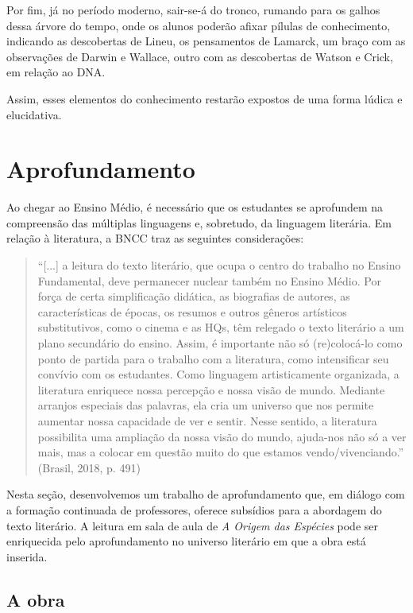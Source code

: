 \documentclass[12pt]{extarticle}
\begin{document}
Por fim, já no período moderno, sair-se-á do tronco, rumando para os
galhos dessa árvore do tempo, onde os alunos poderão afixar pílulas de
conhecimento, indicando as descobertas de Lineu, os pensamentos de
Lamarck, um braço com as observações de Darwin e Wallace, outro com as
descobertas de Watson e Crick, em relação ao DNA.

Assim, esses elementos do conhecimento restarão expostos de uma forma
lúdica e elucidativa.

\section{Aprofundamento}

Ao chegar ao Ensino Médio, é necessário que os estudantes se aprofundem
na compreensão das múltiplas linguagens e, sobretudo, da linguagem
literária. Em relação à literatura, a BNCC traz as seguintes
considerações:

\begin{quotation}
``{[}...{]} a leitura do texto literário, que ocupa o centro do trabalho
no Ensino Fundamental, deve permanecer nuclear também no Ensino Médio.
Por força de certa simplificação didática, as biografias de autores, as
características de épocas, os resumos e outros gêneros artísticos
substitutivos, como o cinema e as HQs, têm relegado o texto literário a
um plano secundário do ensino. Assim, é importante não só (re)colocá-lo
como ponto de partida para o trabalho com a literatura, como
intensificar seu convívio com os estudantes. Como linguagem
artisticamente organizada, a literatura enriquece nossa percepção e
nossa visão de mundo. Mediante arranjos especiais das palavras, ela cria
um universo que nos permite aumentar nossa capacidade de ver e sentir.
Nesse sentido, a literatura possibilita uma ampliação da nossa visão do
mundo, ajuda-nos não só a ver mais, mas a colocar em questão muito do
que estamos vendo/vivenciando.'' (Brasil, 2018, p. 491)
\end{quotation}

Nesta seção, desenvolvemos um trabalho de aprofundamento que, em diálogo
com a formação continuada de professores, oferece subsídios para a
abordagem do texto literário. A leitura em sala de aula de \emph{A
Origem das Espécies} pode ser enriquecida pelo aprofundamento no
universo literário em que a obra está inserida.

\subsection{A obra}
\end{document}
